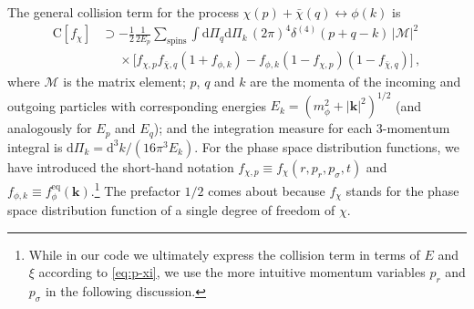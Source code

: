 \documentclass[
onecolumn, %
11pt, %
tightenlines,
superscriptaddress, %
nofootinbib, %
preprintnumbers, %
prd %
]{revtex4-1}
\renewcommand{\vec}[1]{{\boldsymbol{#1}}}
\newcommand{\upd}{\mathrm d}                                          %
\newcommand{\f}{\ensuremath{f_\chi}\xspace}
\begin{document}
The general collision term for the process $\chi(p) + \bar\chi(q) \leftrightarrow \phi(k)$ is~\cite{Gondolo:1990dk}
%
\begin{align}
    \boldsymbol{\mathrm C}[f_\chi] &\supset
      - \frac{1}{2}\frac{1}{2E_p} \sum_\text{spins} \int \upd\Pi_q \upd\Pi_k  \,
        (2\pi)^4 \delta^{(4)}(p+q-k) \, |\mathcal M|^2 \nonumber\\
    &\phantom{\supset} \times
        \Big[ f_{\chi,p} f_{\bar\chi,q} (1 + f_{\phi,k}) 
            - f_{\phi,k} (1 - f_{\chi,p}) (1 - f_{\bar\chi,q}) \Big] \,,
\end{align}
%
where $\mathcal M$ is the matrix element; $p$, $q$ and $k$ are the momenta of the incoming and outgoing particles with corresponding energies $E_k = ( m_\phi^2 + |\vec k|^2 )^{1/2}$ (and analogously for $E_p$ and $E_q$); and the integration measure for each 3-momentum integral is $\upd\Pi_k = \upd^3k / (16 \pi^3 E_k)$. For the phase space distribution functions, we have introduced the short-hand notation $f_{\chi,p} \equiv f_\chi(r, p_r, p_\sigma, t)$ and $f_{\phi,k} \equiv f_\phi^\text{eq}(\vec k)$.\footnote{While in our code we ultimately express the collision term in terms of $E$ and $\xi$ according to \cref{eq:p-xi}, we use the more intuitive momentum variables $p_r$ and $p_\sigma$ in the following discussion.} The prefactor $1/2$ comes about because \f stands for the phase space distribution function of a single degree of freedom of $\chi$.
\end{document}
